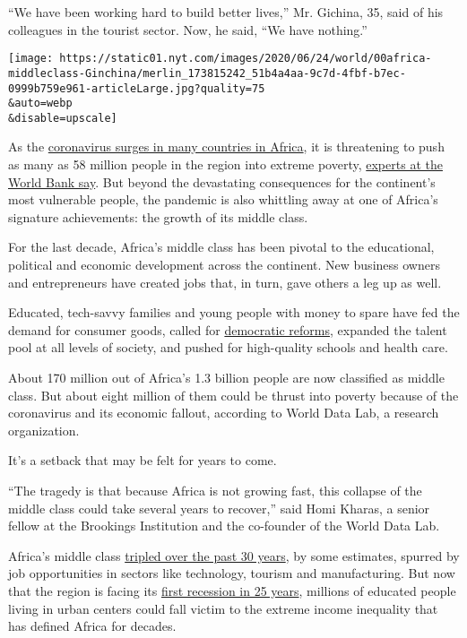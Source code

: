 ``We have been working hard to build better lives,'' Mr. Gichina, 35,
said of his colleagues in the tourist sector. Now, he said, ``We have
nothing.''

\texttt{[image: https://static01.nyt.com/images/2020/06/24/world/00africa-middleclass-Ginchina/merlin\_173815242\_51b4a4aa-9c7d-4fbf-b7ec-0999b759e961-articleLarge.jpg?quality=75\\\&auto=webp\\\&disable=upscale]}

As the
\href{https://www.nytimes.com/2020/06/16/world/africa/coronavirus-africa.html}{coronavirus
surges in many countries in Africa}, it is threatening to push as many
as 58 million people in the region into extreme poverty,
\href{http://documents1.worldbank.org/curated/en/607011589560173878/pdf/How-Much-Will-Poverty-Rise-in-Sub-Saharan-Africa-in-2020.pdf}{experts
at the World Bank say}. But beyond the devastating consequences for the
continent's most vulnerable people, the pandemic is also whittling away
at one of Africa's signature achievements: the growth of its middle
class.

For the last decade, Africa's middle class has been pivotal to the
educational, political and economic development across the continent.
New business owners and entrepreneurs have created jobs that, in turn,
gave others a leg up as well.

Educated, tech-savvy families and young people with money to spare have
fed the demand for consumer goods, called for
\href{https://afrobarometer.org/sites/default/files/publications/Working\%20paper/Afropaperno150.pdf}{democratic
reforms}, expanded the talent pool at all levels of society, and pushed
for high-quality schools and health care.

About 170 million out of Africa's 1.3 billion people are now classified
as middle class. But about eight million of them could be thrust into
poverty because of the coronavirus and its economic fallout, according
to World Data Lab, a research organization.

It's a setback that may be felt for years to come.

``The tragedy is that because Africa is not growing fast, this collapse
of the middle class could take several years to recover,'' said Homi
Kharas, a senior fellow at the Brookings Institution and the co-founder
of the World Data Lab.

Africa's middle class
\href{https://www.afdb.org/fr/news-and-events/africas-middle-class-triples-to-more-than-310m-over-past-30-years-due-to-economic-growth-and-rising-job-culture-reports-afdb-7986}{tripled
over the past 30 years}, by some estimates, spurred by job opportunities
in sectors like technology, tourism and manufacturing. But now that the
region is facing its
\href{https://www.worldbank.org/en/news/video/2020/04/21/africas-pulse-covid-19-coronavirus-causes-first-recession-in-25-years}{first
recession in 25 years}, millions of educated people living in urban
centers could fall victim to the extreme income inequality that has
defined Africa for decades.

